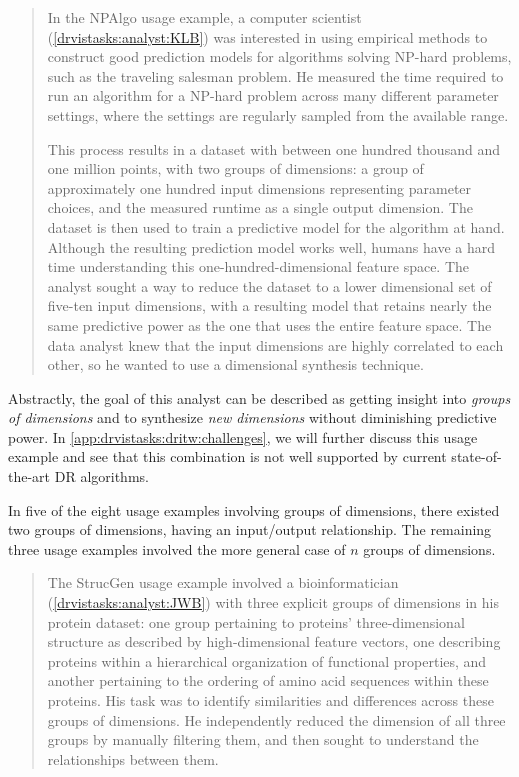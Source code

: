 \begin{quotation}
    In the {\sc NPAlgo} usage example, a computer scientist (\ref{drvistasks:analyst:KLB}) was interested in using empirical methods to construct good prediction models for algorithms solving NP-hard problems, such as the traveling salesman problem.
    He measured the time required to run an algorithm for a NP-hard problem across many different parameter settings, where the settings are regularly sampled from the available range. 

    This process results in a dataset with between one hundred thousand and one million points, with two groups of dimensions: a group of approximately one hundred input dimensions representing parameter choices, and the measured runtime as a single output dimension. 
    The dataset is then used to train a predictive model for the algorithm at hand. 
    Although the resulting prediction model works well, humans have a hard time understanding this one-hundred-dimensional feature space. 
    The analyst sought a way to reduce the dataset to a lower dimensional set of five-ten input dimensions, with a resulting model that retains nearly the same predictive power as the one that uses the entire feature space. 
    The data analyst knew that the input dimensions are highly correlated to each other, so he wanted to use a dimensional synthesis technique.
\end{quotation}

Abstractly, the goal of this analyst can be described as getting insight into {\it groups of dimensions} and to synthesize {\it new dimensions} without diminishing predictive power.
In \autoref{app:drvistasks:dritw:challenges}, we will further discuss this usage example and see that this combination is not well supported by current state-of-the-art \ac{DR} algorithms.

In five of the eight usage examples involving groups of dimensions, there existed two groups of dimensions, having an input/output relationship.  
The remaining three usage examples involved the more general case of $n$ groups of dimensions.  

\begin{quotation}
    \begin{sloppypar}
    The {\sc StrucGen} usage example involved a bioinformatician (\ref{drvistasks:analyst:JWB}) with three explicit groups of dimensions in his protein dataset: one group pertaining to proteins' three-dimensional structure as described by high-dimensional feature vectors, one describing proteins within a hierarchical organization of functional properties, and another pertaining to the ordering of amino acid sequences within these proteins. 
    His task was to identify similarities and differences across these groups of dimensions. 
    He independently reduced the dimension of all three groups by manually filtering them, and then sought to understand the relationships between them.
    \end{sloppypar}
\end{quotation}

